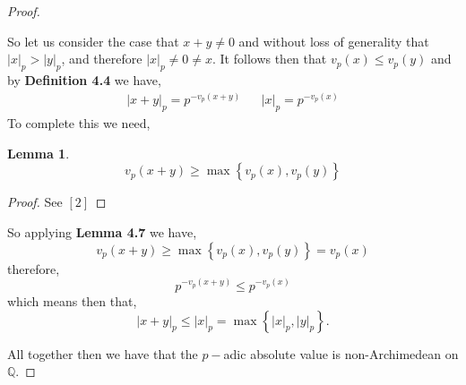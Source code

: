 \documentclass[12pt]{article}
\newtheorem{lem}[thm]{Lemma}
\theoremstyle{definition}
\theoremstyle{remark}
\newcommand{\qq}{\mathbb Q}   %
\newcommand{\abs}[1]{\left\lvert#1\right\rvert} %
\renewcommand{\geq}{\geqslant}
\renewcommand{\leq}{\leqslant}
\newcommand{\lrb}[1]{\left[#1\right]}
\newcommand{\lrc}[1]{\left\{#1\right\}}
\begin{document}
\begin{proof}
\begin{itemize}
        So let us consider the case that $x+y \neq 0$ and without loss of generality that $\abs{x}_p > \abs{y}_p$, and therefore $\abs{x}_p \neq 0 \neq x$. It follows then that $v_p(x) \leq v_p(y)$ and by \textbf{Definition 4.4} we have,
        \begin{align*}
          \abs{x + y}_p = p^{-v_p(x + y)} && \abs{x}_p = p^{-v_p(x)}
        \end{align*}
        To complete this we need,
        \begin{lem}
          \[v_p(x+ y) \geq \max\lrc{v_p(x), v_p(y)}\]
        \end{lem}
        \begin{proof}
          See $\lrb{2}$
        \end{proof}
        So applying \textbf{Lemma 4.7} we have,
        \[v_p(x + y) \geq \max\lrc{v_p(x), v_p(y)} = v_p(x)\]
        therefore,
        \[p^{-v_p(x + y)} \leq p^{-v_p(x)}\]
        which means then that,
        \[\abs{x + y}_p \leq \abs{x}_p = \max\lrc{\abs{x}_p, \abs{y}_p}.\]
      \end{itemize}

      All together then we have that the $p-$adic absolute value is non-Archimedean on $\qq$. 
    \end{proof}
\end{document}
